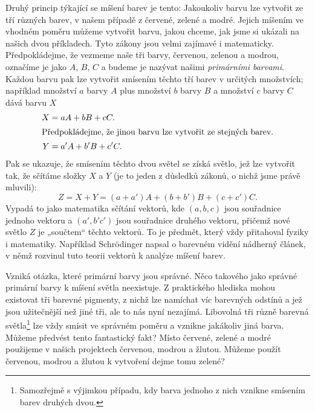     Druhý princip týkající se míšení barev je tento: Jakoukoliv barvu lze vytvořit ze tří různých 
    barev, v našem případě z červené, zelené a modré. Jejich míšením ve vhodném poměru můžeme 
    vytvořit barvu, jakou chceme, jak jsme si ukázali na našich dvou příkladech. Tyto zákony jsou 
    velmi zajímavé i matematicky. Předpokládejme, že vezmeme naše tři barvy, červenou, zelenou a 
    modrou, označíme je jako \(A\), \(B\), \(C\) a budeme je nazývat našimi \emph{primárními 
    barvami}. Každou barvu pak lze vytvořit smísením těchto tří barev v určitých množstvích; 
    například množství \(a\) barvy \(A\) plus množství \(b\) barvy \(B\) a množství \(c\) barvy 
    \(C\) dává barvu \(X\)
    \begin{align}
      X &= aA + bB + cC.     \label{fyz:eq231}     \\
      \shortintertext{Předpokládejme, že jinou barvu lze vytvořit ze stejných barev.}
      Y &= a'A + b'B + c'C.  \label{fyz:eq232}
    \end{align}
    Pak se ukazuje, že smísením těchto dvou světel se získá světlo, jež lze vytvořit tak, že 
    sčítáme složky \(X\) a \(Y\) (je to jeden z důsledků zákonů, o nichž jsme právě mluvili):
    \begin{equation}\label{fyz:eq233}
      Z = X + Y = (a+a')A + (b+b')B + (c+c')C.
    \end{equation}
    Vypadá to jako matematika sčítání vektorů, kde \((a, b, c)\) jsou souřadnice jednoho vektoru a 
    \((a', b' c')\) jsou souřadnice druhého vektoru, přičemž nové světlo \(Z\) je „součtem“ těchto 
    vektorů. To je předmět, který vždy přitahoval fyziky i matematiky. Například Schr{\"o}dinger 
    napsal o barevném vidění nádherný článek, v němž rozvinul tuto teorii vektorů k analýze míšení 
    barev.
    
    Vzniká otázka, které primární barvy jsou správné. Něco takového jako správné primární barvy k 
    míšení světla neexistuje. Z praktického hlediska mohou existovat tři barevné pigmenty, z nichž 
    lze namíchat víc barevných odstínů a jež jsou užitečnější než jiné tři, ale to nás nyní 
    nezajímá. Libovolná tři různě barevná světla\footnote{ Samozřejmě s výjimkou případu, kdy barva 
    jednoho z nich vznikne smísením barev druhých dvou. } lze vždy smísit ve správném poměru a 
    vznikne jakákoliv jiná barva. Můžeme předvést tento fantastický fakt? Místo červené, zelené a 
    modré použijeme v našich projektech červenou, modrou a žlutou. Můžeme použít červenou, modrou a 
    žlutou k vytvoření dejme tomu zelené?
    
